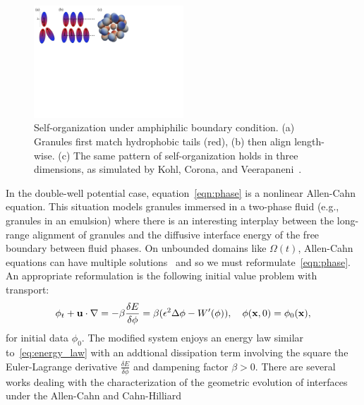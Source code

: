 \begin{figure}
  \vspace{-8pt}
  \centerline{\includegraphics[width=0.5\textwidth]{figures/SA1Figures/AmphiphilicAssembly.pdf}}
  \vspace{-8pt}
  \caption{\label{fig:amphiphilic_assembly} \footnotesize
  Self-organization under amphiphilic boundary condition. (a) Granules
  first match hydrophobic tails (red), (b) then align length-wise. (c)
  The same pattern of self-organization holds in three dimensions, as
  simulated by Kohl, Corona, and
  Veerapaneni~\cite{koh-cor-che-vee2021}.}
\end{figure}
In the double-well potential case, equation~\eqref{eqn:phase} is a
nonlinear Allen-Cahn equation. This situation models granules immersed
in a two-phase fluid (e.g., granules in an emulsion) where there is an
interesting interplay between the long-range alignment of granules and
the diffusive interface energy of the free boundary between fluid
phases. On unbounded domains like $\Omega(t)$, Allen-Cahn equations can
have multiple solutions~\cite{Alama1997StationaryLS,
Alikakos2008OnAE, Bronsard1993OnTB, Byeon2014SolutionsOH, Byeon2013OnAP,
Alessio2005ENTIRESI, Trumper2007ExistenceOA, Benci2019MultipleSF} and so
we must reformulate~\eqref{eqn:phase}. An appropriate reformulation
is the following initial value problem with transport:
\begin{align}
  \label{eqn:phase_transport}
  \phi_t + \mathbf{u} \cdot \nabla
  = -\beta \frac{\delta E}{\delta \phi}
  = \beta(\epsilon^2 \Delta \phi - W'(\phi)),
  \quad \phi(\mathbf{x},0) = \phi_0(\mathbf{x}),
\end{align}
for initial data $\phi_0$. The modified system enjoys an energy law
similar to~\eqref{eq:energy_law} with an addtional dissipation term
involving the square the Euler-Lagrange derivative $\frac{\delta
E}{\delta \phi}$ and dampening factor $\beta > 0$. There are several
works dealing with the characterization of the geometric evolution of
interfaces under the Allen-Cahn and Cahn-Hilliard
